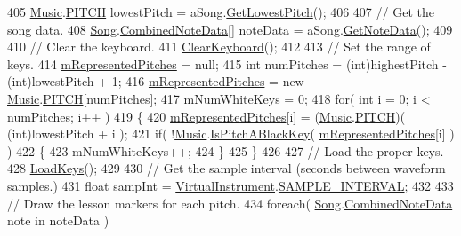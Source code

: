 \begin{DoxyCodeInclude}
405         \hyperlink{class_music}{Music}.\hyperlink{group___music_enums_ga508f69b199ea518f935486c990edac1d}{PITCH} lowestPitch = aSong.\hyperlink{group___song_pub_func_gae4e71c8eb059cc9cf0b77e78971ab326}{GetLowestPitch}();
406 
407         \textcolor{comment}{// Get the song data.}
408         \hyperlink{class_song}{Song}.\hyperlink{group___song_structs_struct_song_1_1_combined_note_data}{CombinedNoteData}[] noteData = aSong.\hyperlink{group___song_pub_func_gae3df1fd5448b7d9cefb0fed4af967985}{GetNoteData}();
409 
410         \textcolor{comment}{// Clear the keyboard.}
411         \hyperlink{group___key_contain_priv_func_ga679f5ca9d6b1505180e90ee00bbfe616}{ClearKeyboard}();
412 
413         \textcolor{comment}{// Set the range of keys.}
414         \hyperlink{group___key_contain_priv_var_ga103945a6efe3469191e5253d13fec5be}{mRepresentedPitches} = null;
415         \textcolor{keywordtype}{int} numPitches = (int)highestPitch - (\textcolor{keywordtype}{int})lowestPitch + 1;
416         \hyperlink{group___key_contain_priv_var_ga103945a6efe3469191e5253d13fec5be}{mRepresentedPitches} = \textcolor{keyword}{new} \hyperlink{class_music}{Music}.\hyperlink{group___music_enums_ga508f69b199ea518f935486c990edac1d}{PITCH}[numPitches];
417         mNumWhiteKeys = 0;
418         \textcolor{keywordflow}{for}( \textcolor{keywordtype}{int} i = 0; i < numPitches; i++ )
419         \{
420             \hyperlink{group___key_contain_priv_var_ga103945a6efe3469191e5253d13fec5be}{mRepresentedPitches}[i] = (\hyperlink{class_music}{Music}.\hyperlink{group___music_enums_ga508f69b199ea518f935486c990edac1d}{PITCH})( (\textcolor{keywordtype}{int})lowestPitch + i );
421             \textcolor{keywordflow}{if}( !\hyperlink{class_music}{Music}.\hyperlink{group___music_stat_func_gacc2c1a66df7197225f61c5737f794065}{IsPitchABlackKey}( 
      \hyperlink{group___key_contain_priv_var_ga103945a6efe3469191e5253d13fec5be}{mRepresentedPitches}[i] ) )
422             \{
423                 mNumWhiteKeys++;
424             \}
425         \}
426 
427         \textcolor{comment}{// Load the proper keys.}
428         \hyperlink{group___key_contain_priv_func_ga65f79700f265d2223681ac95981ab4a3}{LoadKeys}();
429 
430         \textcolor{comment}{// Get the sample interval (seconds between waveform samples.)}
431         \textcolor{keywordtype}{float} sampInt = \hyperlink{class_virtual_instrument}{VirtualInstrument}.\hyperlink{group___v_i_base_const_ga69a037919b64e1e3e0f2b949b2b6af2c}{SAMPLE\_INTERVAL};
432 
433         \textcolor{comment}{// Draw the lesson markers for each pitch.}
434         \textcolor{keywordflow}{foreach}( \hyperlink{class_song}{Song}.\hyperlink{group___song_structs_struct_song_1_1_combined_note_data}{CombinedNoteData} note in noteData )

\end{DoxyCodeInclude}
